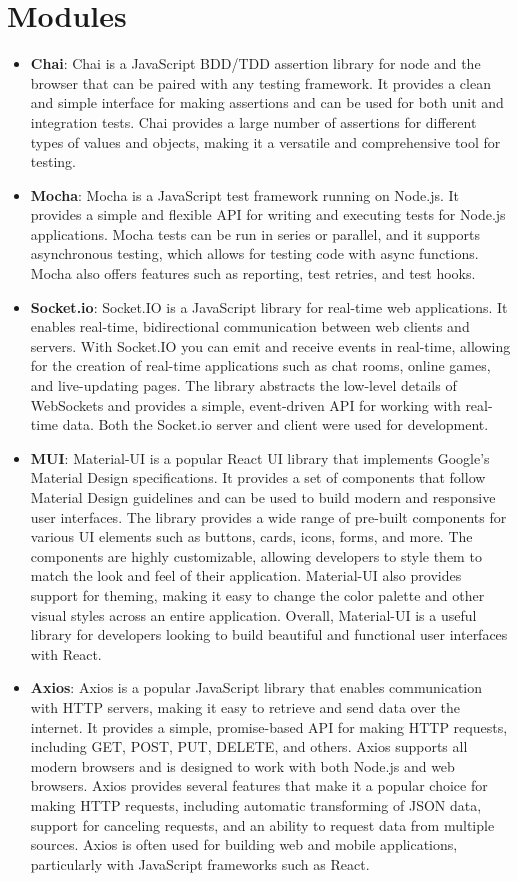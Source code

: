     \section{Modules}
    \begin{itemize}
        \item \textbf{Chai}: Chai is a JavaScript BDD/TDD assertion library for node and the browser that can be paired with any testing framework. It provides a clean and simple interface for making assertions and can be used for both unit and integration tests. Chai provides a large number of assertions for different types of values and objects, making it a versatile and comprehensive tool for testing.
        \item \textbf{Mocha}: Mocha is a JavaScript test framework running on Node.js. It provides a simple and flexible API for writing and executing tests for Node.js applications. Mocha tests can be run in series or parallel, and it supports asynchronous testing, which allows for testing code with async functions. Mocha also offers features such as reporting, test retries, and test hooks.
        \item \textbf{Socket.io}: Socket.IO is a JavaScript library for real-time web applications. It enables real-time, bidirectional communication between web clients and servers. With Socket.IO you can emit and receive events in real-time, allowing for the creation of real-time applications such as chat rooms, online games, and live-updating pages. The library abstracts the low-level details of WebSockets and provides a simple, event-driven API for working with real-time data. Both the Socket.io server and client were used for development.
        \item\textbf{MUI}: Material-UI is a popular React UI library that implements Google's Material Design specifications. It provides a set of components that follow Material Design guidelines and can be used to build modern and responsive user interfaces. The library provides a wide range of pre-built components for various UI elements such as buttons, cards, icons, forms, and more. The components are highly customizable, allowing developers to style them to match the look and feel of their application. Material-UI also provides support for theming, making it easy to change the color palette and other visual styles across an entire application. Overall, Material-UI is a useful library for developers looking to build beautiful and functional user interfaces with React. 
        \item\textbf{Axios}: Axios is a popular JavaScript library that enables communication with HTTP servers, making it easy to retrieve and send data over the internet. It provides a simple, promise-based API for making HTTP requests, including GET, POST, PUT, DELETE, and others. Axios supports all modern browsers and is designed to work with both Node.js and web browsers. Axios provides several features that make it a popular choice for making HTTP requests, including automatic transforming of JSON data, support for canceling requests, and an ability to request data from multiple sources. Axios is often used for building web and mobile applications, particularly with JavaScript frameworks such as React.

\end{itemize}
